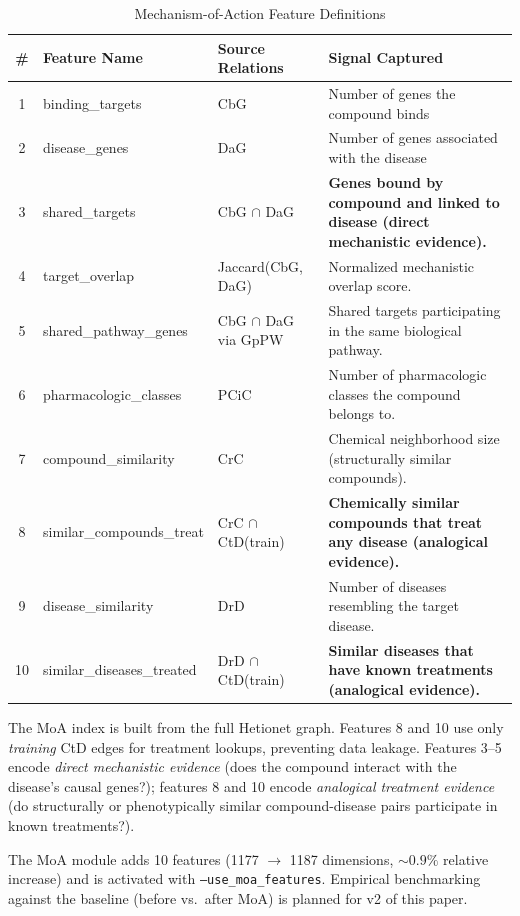 \documentclass[twocolumn,10pt]{article}
\begin{document}
\begin{table}[t]
\centering
\caption{Mechanism-of-Action Feature Definitions}
\label{tab:moa}
\small
\setlength{\tabcolsep}{4pt}
\begin{tabularx}{\textwidth}{@{}c >{\ttfamily\raggedright\arraybackslash}p{} >{\raggedright\arraybackslash}p{} X@{}}
\toprule
\textbf{\#} & \textbf{Feature Name} & \textbf{Source Relations} & \textbf{Signal Captured} \\
\midrule
1 & binding\_targets & CbG & Number of genes the compound binds \\
2 & disease\_genes & DaG & Number of genes associated with the disease \\
3 & shared\_targets & CbG $\cap$ DaG & \textbf{Genes bound by compound and linked to disease (direct mechanistic evidence).} \\
4 & target\_overlap & Jaccard(CbG, DaG) & Normalized mechanistic overlap score. \\
5 & shared\_pathway\_genes & CbG $\cap$ DaG via GpPW & Shared targets participating in the same biological pathway. \\
6 & pharmacologic\_classes & PCiC & Number of pharmacologic classes the compound belongs to. \\
7 & compound\_similarity & CrC & Chemical neighborhood size (structurally similar compounds). \\
8 & similar\_compounds\_treat & CrC $\cap$ CtD(train) & \textbf{Chemically similar compounds that treat any disease (analogical evidence).} \\
9 & disease\_similarity & DrD & Number of diseases resembling the target disease. \\
10 & similar\_diseases\_treated & DrD $\cap$ CtD(train) & \textbf{Similar diseases that have known treatments (analogical evidence).} \\
\bottomrule
\end{tabularx}
\end{table}

The MoA index is built from the full Hetionet graph. Features 8 and 10 use only \textit{training} CtD edges for treatment lookups, preventing data leakage. Features 3--5 encode \textit{direct mechanistic evidence} (does the compound interact with the disease's causal genes?); features 8 and 10 encode \textit{analogical treatment evidence} (do structurally or phenotypically similar compound-disease pairs participate in known treatments?).

The MoA module adds 10 features (1177 $\to$ 1187 dimensions, ${\sim}0.9\%$ relative increase) and is activated with \texttt{--use\_moa\_features}. Empirical benchmarking against the baseline (before vs.\ after MoA) is planned for v2 of this paper.
\end{document}
